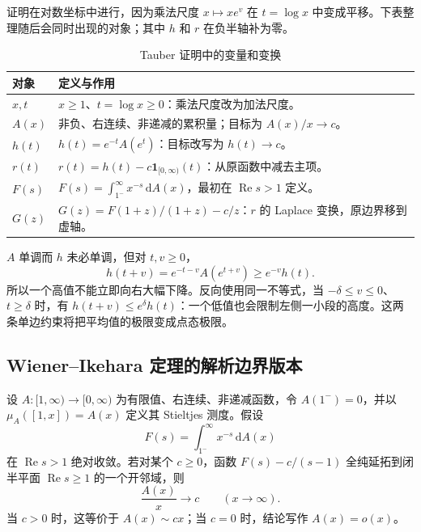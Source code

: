 证明在对数坐标中进行，因为乘法尺度 \(x\mapsto xe^v\) 在 \(t=\log x\) 中变成平移。下表整理随后会同时出现的对象；其中 \(h\) 和 \(r\) 在负半轴补为零。
\begin{table}[htbp]
\centering
\caption{Tauber 证明中的变量和变换}
\label{b3:tab:27-tauber-objects}
\begin{tabularx}{\textwidth}{@{}lX@{}}
\toprule
对象 & 定义与作用 \\
\midrule
\(x,t\) & \(x\ge1\)、\(t=\log x\ge0\)：乘法尺度改为加法尺度。 \\
\(A(x)\) & 非负、右连续、非递减的累积量；目标为 \(A(x)/x\to c\)。 \\
\(h(t)\) & \(h(t)=e^{-t}A(e^t)\)：目标改写为 \(h(t)\to c\)。 \\
\(r(t)\) & \(r(t)=h(t)-c\mathbf1_{[0,\infty)}(t)\)：从原函数中减去主项。 \\
\(F(s)\) & \(F(s)=\int_{1^-}^{\infty}x^{-s}\,\mathrm dA(x)\)，最初在 \(\operatorname{Re}s>1\) 定义。 \\
\(G(z)\) & \(G(z)=F(1+z)/(1+z)-c/z\)：\(r\) 的 Laplace 变换，原边界移到虚轴。 \\
\bottomrule
\end{tabularx}
\end{table}

\(A\) 单调而 \(h\) 未必单调，但对 \(t,v\ge0\)，
\begin{equation}
\label{b3:eq:27-slow-decrease}
 h(t+v)=e^{-t-v}A(e^{t+v})\ge e^{-v}h(t).
\end{equation}
所以一个高值不能立即向右大幅下降。反向使用同一不等式，当 \(-\delta\le v\le0\)、\(t\ge\delta\) 时，有 \(h(t+v)\le e^\delta h(t)\)：一个低值也会限制左侧一小段的高度。这两条单边约束将把平均值的极限变成点态极限。

\subsection{Wiener–Ikehara 定理的解析边界版本}
\label{b3:subsec:270402}

\begin{theorem}
\label{b3:thm:27-wiener-ikehara}
设 \(A:[1,\infty)\to[0,\infty)\) 为有限值、右连续、非递减函数，令 \(A(1^-)=0\)，并以 \(\mu_A([1,x])=A(x)\) 定义其 Stieltjes 测度。假设
\[
 F(s)=\int_{1^-}^\infty x^{-s}\,\mathrm dA(x)
\]
在 \(\operatorname{Re}s>1\) 绝对收敛。若对某个 \(c\ge0\)，函数 \(F(s)-c/(s-1)\) 全纯延拓到闭半平面 \(\operatorname{Re}s\ge1\) 的一个开邻域，则
\[
 \frac{A(x)}x\longrightarrow c\qquad(x\to\infty).
\]
当 \(c>0\) 时，这等价于 \(A(x)\sim cx\)；当 \(c=0\) 时，结论写作 \(A(x)=o(x)\)。
\end{theorem}

